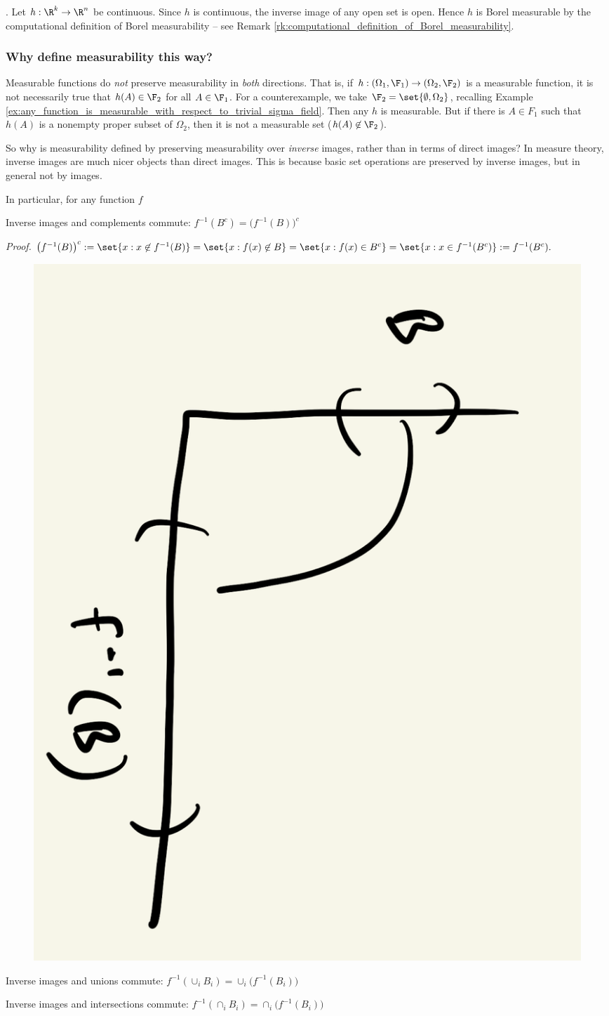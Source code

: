 \documentclass{article} %
\begin{document}
\begin{example}{}. Let $h : \R^k \to \R^n$ be continuous.  Since $h$ is continuous, the inverse image of any open set is open. Hence $h$ is Borel measurable by the computational definition of Borel measurability -- see Remark \ref{rk:computational_definition_of_Borel_measurability}.
\end{example}

\subsubsection{Why define measurability this way?} \label{sec:why_define_measurability_this_way}

Measurable functions do \textit{not} preserve measurability in \textit{both} directions. That is, if $h : (\Omega_1, \F_1) \to (\Omega_2, \F_2)$ is a measurable function, it is not necessarily true that $h(A) \in \F_2$ for all $A \in \F_1$.  For a counterexample, we take $\F_2 = \set{\emptyset, \Omega_2}$, recalling Example \ref{ex:any_function_is_measurable_with_respect_to_trivial_sigma_field}.   Then any $h$ is measurable.  But if there is $A \in F_1$ such that $h(A)$ is a nonempty proper subset of $\Omega_2$, then it is not a measurable set ($h(A) \not\in \F_2$). 

So why is measurability defined by preserving measurability over \textit{inverse} images, rather than in terms of direct images?  In measure theory, inverse images are much nicer objects than direct images.  This is because basic set operations are preserved by inverse images, but in general not by images.  

In particular, for any function $f$
\begin{alphabate}
\item Inverse images and complements commute: $f^{-1}(B^c) = \big(f^{-1}(B)\big)^c$	

\textit{Proof.} $ \big(f^{-1}(B)\big)^c := \set{x : x \not\in f^{-1}(B) } = \set{x : f(x) \not\in B } = \set{x: f(x) \in B^c} = \set{x: x \in f^{-1}(B^c)} := f^{-1}(B^c).$

\begin{figure}[H]
\centering
\includegraphics[angle=90, width=.25\textwidth]{images/inverse_images_and_complements_commute}	
\end{figure}


\item Inverse images and unions commute: $f^{-1}(\cup_i B_i) = \cup_i \big(f^{-1}(B_i)\big)$
\item Inverse images and intersections commute: $f^{-1}(\cap_i B_i) = \cap_i \big(f^{-1}(B_i)\big)$	
\end{alphabate}
\end{document}
